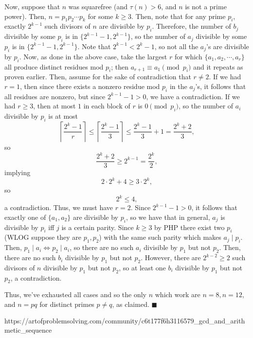 \documentclass[a4paper]{article}
\begin{document}
\begin{question*}[c]{}
{Now, suppose that $n$ was squarefree (and $\tau(n) > 6$, and $n$ is not a prime power). Then, $n = p_1p_2\cdots p_k$ for some $k\geq 3$. Then, note that for any prime $p_i$, exactly $2^{k-1}$ such divisors of $n$ are divisible by $p_i$. Therefore, the number of $b_j$ divisible by some $p_i$ is in $\{2^{k-1} - 1, 2^{k-1}\}$, so the number of $a_j$ divisible by some $p_i$ is in $\{2^{k-1}-1, 2^{k-1}\}$. Note that $2^{k-1} < 2^k-1$, so not all the $a_j$'s are divisible by $p_i$. Now, as done in the above case, take the largest $r$ for which $\{a_1, a_2, \cdots, a_r\}$ all produce distinct residues mod $p_i$; then $a_{r+1}\equiv a_1\pmod{p_i}$ and it repeats as proven earlier. Then, assume for the sake of contradiction that $r\neq 2$. If we had $r = 1$, then since there exists a nonzero residue mod $p_i$ in the $a_j$'s, it follows that all residues are nonzero, but since $2^{k-1} - 1 > 0$, we have a contradiction. If we had $r \geq 3$, then at most $1$ in each block of $r$ is $0\pmod{p_i}$, so the number of $a_i$ divisible by $p_i$ is at most $$\left \lceil \frac{2^k-1}{r}\right \rceil \leq \left \lceil \frac{2^k-1}{3}\right \rceil \leq \frac{2^k-1}{3} + 1 = \frac{2^k+2}{3},$$so $$\frac{2^k+2}{3} \geq 2^{k-1} = \frac{2^k}{2},$$implying $$2\cdot 2^k + 4\geq 3\cdot 2^k,$$so $$2^k \leq 4,$$a contradiction. Thus, we must have $r = 2$. Since $2^{k-1} - 1 > 0$, it follows that exactly one of $\{a_1, a_2\}$ are divisible by $p_i$, so we have that in general, $a_j$ is divisible by $p_i$ iff $j$ is a certain parity. Since $k\geq 3$ by PHP there exist two $p_i$ (WLOG suppose they are $p_1, p_2$) with the same such parity which makes $a_j \mid p_i$. Then, $p_1\mid a_i\iff p_2 \mid a_i$, so there are no such $a_i$ divisible by $p_1$ but not $p_2$. Then, there are no such $b_i$ divisible by $p_1$ but not $p_2$. However, there are $2^{k-2} \geq 2$ such divisors of $n$ divisible by $p_1$ but not $p_2$, so at least one $b_i$ divisible by $p_1$ but not $p_2$, a contradiction.

Thus, we've exhausted all cases and so the only $n$ which work are $n = 8, n=12$, and $n=pq$ for distinct primes $p\neq q$, as claimed. $\blacksquare$
    }{%
    https://artofproblemsolving.com/community/c6t177f6h3116579_gcd_and_arithmetic_sequence
  }

\end{question*}
\end{document}
